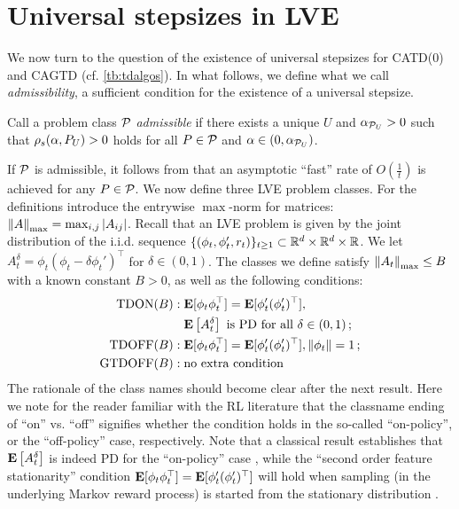 \section{Universal stepsizes in LVE}\label{sec:rl}
We now turn to the question of the existence of universal stepsizes for CATD(0) and CAGTD (cf. \cref{tb:tdalgos}). 
In what follows, we define what we call \emph{admissibility}, 
a sufficient condition for the existence of a universal stepsize. 
\begin{definition}\label{def:admis}
Call a problem class $\P$ \emph{admissible} if there exists a unique $U$ and $\alpha_{\P_U}>0$ such that
$\rhos{P_U}>0$ holds for all $P\in \P$ and $\alpha\in(0,\alpha_{\P_U})$.
\end{definition}
If $\P$ is admissible, it  follows from  that an asymptotic ``fast'' rate of $O(\frac1t)$ is achieved for any $P\in \cP$. 
We now define three LVE problem classes. For the definitions introduce
the entrywise $\max$-norm for matrices: $\norm{A}_{\max} = \max_{i,j} |A_{ij}|$.
Recall that an LVE problem is given by the joint distribution of the i.i.d. sequence
$\{(\phi_t,\phi_t',r_t)\}_{t\ge 1}\subset \R^d\times \R^d \times \R$. We let 
$A_t^\delta = \phi_t(\phi_t - \delta \phi_t')^\top$ for $\delta\in (0,1)$.
The classes we define satisfy $\norm{A_t}_{\max}\le B$ with a known constant $B>0$, 
as well as the following conditions:
\begin{align*}
\text{TDON}(B)&: \E[\phi_t\phi_t^\top]=\E[\phi'_t(\phi'_t)^\top], \\
						& \,\,\,\,\, \EE{A_t^\delta} \text{ is PD for all } \delta\in (0,1)\,;\\
\text{TDOFF}(B)&: \E[\phi_t\phi_t^\top]=\E[\phi'_t(\phi'_t)^\top], \norm{\phi_t}=1\,;\\
\text{GTDOFF}(B)&: \text{no extra condition}
\end{align*}
The rationale of the class names should become clear after the next result.
Here we note for the reader familiar with the RL literature that the classname ending of ``on'' vs. ``off'' signifies
whether the condition holds in the so-called ``on-policy'', or the ``off-policy'' case, respectively.
Note that a classical result establishes that $\EE{A_t^\delta}$ is indeed PD for the ``on-policy'' case
\cite{su88},
while the ``second order feature stationarity'' condition $ \E[\phi_t\phi_t^\top]=\E[\phi'_t(\phi'_t)^\top]$ will hold 
when sampling (in the underlying Markov reward process) 
is started from the stationary distribution \cite{su88}. 
